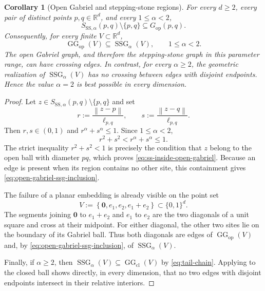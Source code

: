 \documentclass[a4paper,fleqn]{cas-sc}
\newtheorem{corollary}{Corollary}
\theoremstyle{definition}
\theoremstyle{remark}
\newcommand{\R}{\mathds{R}}
\newcommand{\norm}[1]{\left\lVert #1\right\rVert}
\newcommand{\set}[1]{\left\{#1\right\}}
\newcommand{\ellpq}{\ell_{p,q}}
\newcommand{\0}{\mathbf{0}}
\DeclareMathOperator{\SSG}{SSG}
\DeclareMathOperator{\GG}{GG}
\begin{document}
\begin{corollary}[Open Gabriel and stepping-stone regions]
\label{cor:ss-crossing}
For every $d\geq2$, every pair of distinct points $p,q\in\R^d$, and every
$1\leq\alpha<2$,
\begin{equation}\label{eq:ss-inside-open-gabriel}
    S_{\mathrm{SS},\alpha}(p,q)\setminus\{p,q\}
    \subseteq G_{\mathrm{op}}(p,q).
\end{equation}
Consequently, for every finite $V\subset\R^d$,
\begin{equation}\label{eq:open-gabriel-ssg-inclusion}
    \GG_{\mathrm{op}}(V)\subseteq\SSG_\alpha(V),
    \qquad 1\leq\alpha<2.
\end{equation}
The open Gabriel graph, and therefore the stepping-stone graph in this
parameter range, can have crossing edges.  In contrast, for every
$\alpha\geq2$, the geometric realization of $\SSG_\alpha(V)$ has no
crossing between edges with disjoint endpoints. Hence the value
$\alpha=2$ is best possible in every dimension.
\end{corollary}

\begin{proof}
Let $z\in S_{\mathrm{SS},\alpha}(p,q)\setminus\{p,q\}$ and set
\begin{equation}
    r:=\frac{\norm{z-p}}{\ellpq},
    \qquad
    s:=\frac{\norm{z-q}}{\ellpq}.
\end{equation}
Then $r,s\in(0,1)$ and $r^\alpha+s^\alpha\leq1$. Since
$1\leq\alpha<2$,
\begin{equation}
    r^2+s^2<r^\alpha+s^\alpha\leq1.
\end{equation}
The strict inequality $r^2+s^2<1$ is precisely the condition that $z$
belong to the open ball with diameter $pq$, which proves
\eqref{eq:ss-inside-open-gabriel}.  Because an edge is present when its
region contains no other site, this containment gives
\eqref{eq:open-gabriel-ssg-inclusion}.

The failure of a planar embedding is already visible on the point set
\begin{equation}\label{eq:binary-crossing-witness}
    V:=\set{\0,e_1,e_2,e_1+e_2}\subset\{0,1\}^d.
\end{equation}
The segments joining $\0$ to $e_1+e_2$ and $e_1$ to $e_2$ are the two
diagonals of a unit square and cross at their midpoint.  For either
diagonal, the other two sites lie on the boundary of its Gabriel ball.
Thus both diagonals are edges of $\GG_{\mathrm{op}}(V)$ and, by
\eqref{eq:open-gabriel-ssg-inclusion}, of $\SSG_\alpha(V)$.

Finally, if $\alpha\geq2$, then
$\SSG_\alpha(V)\subseteq\GG_{\mathrm{cl}}(V)$ by
\eqref{eq:tail-chain}. Applying
 to the closed ball shows directly,
in every dimension, that no two edges with disjoint endpoints intersect in
their relative interiors.
\end{proof}
\end{document}

